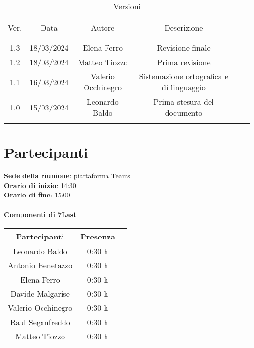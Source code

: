 \documentclass[italian,12pt]{article} %
\begin{document}


\newpage





\begin{table}[!h]
	\caption{Versioni}
	\begin{center}
		\begin{tabular}{ c c c c c c }
			\hline \\[-2ex]
			Ver. & Data & Autore & Descrizione \\
			\\[-2ex] \hline \\[-1.5ex]
			1.3 & 18/03/2024 & Elena Ferro & Revisione finale \\
			1.2 & 18/03/2024 & Matteo Tiozzo & Prima revisione \\
			1.1 & 16/03/2024 & Valerio Occhinegro& Sistemazione ortografica e di linguaggio \\
			1.0 & 15/03/2024 & Leonardo Baldo& Prima stesura del documento \\
			\\[-1.5ex] \hline
		\end{tabular}
	\end{center}
\end{table}
\newpage

\tableofcontents

\newpage

\section{Partecipanti}


\textbf{Sede della riunione}: piattaforma Teams\\
\textbf{Orario di inizio}: 14:30\\
\textbf{Orario di fine}: 15:00\\


\paragraph{Componenti di 7Last}

\begin{flushleft}
\begin{table}[!h]
\begin{tabular}{ |c|c|c| } 
	\hline
	\textbf{Partecipanti} & \textbf{Presenza} \\
	\hline 
	Leonardo Baldo 		 & 0:30 h \\ 
	Antonio Benetazzo 	 & 0:30 h \\
	Elena Ferro 		 & 0:30 h \\
	Davide Malgarise 	 & 0:30 h \\
	Valerio Occhinegro 	 & 0:30 h \\
	Raul Seganfreddo 	 & 0:30 h \\
	Matteo Tiozzo 		 & 0:30 h \\ 
	\hline
\end{tabular}
\end{table}
\end{flushleft}
\end{document}
